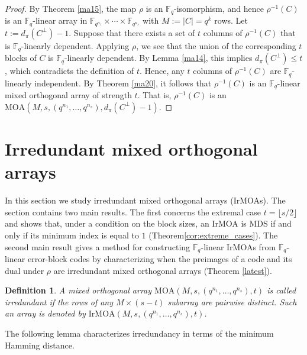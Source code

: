 \documentclass[11pt]{article}
\newtheorem{Definition}[Theorem]{Definition}
\newtheorem{Definition and Notation}[Theorem]{Definition and Notation}
\begin{document}
\begin{proof}
By Theorem \ref{ma15}, the map $\rho$ is an $\mathbb{F}_q$-isomorphism, and hence $\rho^{-1}(C)$ is an $\mathbb{F}_q$-linear array in $\mathbb{F}_{q^{n_1}}\times\cdots\times\mathbb{F}_{q^{n_s}}$ with $M:=|C|=q^k$ rows. Let $t := d_\pi(C^\perp)-1.$ Suppose that there exists a set of $t$ columns of $\rho^{-1}(C)$ that is $\mathbb F_q$-linearly dependent. Applying $\rho$, we see that the union of the corresponding $t$ blocks of $C$ is $\mathbb{F}_q$-linearly dependent. By Lemma \ref{ma14}, this implies $d_\pi(C^\perp)\le t$, which contradicts the definition of $t$. Hence, any $t$ columns of $\rho^{-1}(C)$ are $\mathbb{F}_q$-linearly independent. By Theorem \ref{ma20}, it follows that $\rho^{-1}(C)$ is an $\mathbb{F}_q$-linear mixed orthogonal array of strength $t$. That is, $\rho^{-1}(C)$ is an $\mathrm{MOA}\left(M, s, (q^{n_1},\dots,q^{n_s}), d_\pi(C^\perp)-1\right)$.
\end{proof}


\section{Irredundant mixed orthogonal arrays}

In this section we study irredundant mixed orthogonal arrays (IrMOAs).  The section contains two main results. The first concerns the extremal case $t=\lfloor s/2\rfloor$ and shows that, under a  condition on the block sizes, an IrMOA is MDS if and only if its minimum index is equal to $1$ (Theorem\ref{cor:extreme_cases}). The second main result gives a method for constructing $\mathbb{F}_q$-linear IrMOAs from $\mathbb{F}_q$-linear error-block codes by characterizing when the preimages of a code and its dual under $\rho$ are irredundant mixed orthogonal arrays (Theorem \ref{latest}).

\begin{Definition}\cite{GBZ2016}
A mixed orthogonal array $\mathrm{MOA}\left(M, s, (q^{n_1},\dots, q^{n_s}), t\right)$ is called irredundant if the rows of any $M\times (s-t)$ subarray are pairwise distinct. Such an array is denoted by $\mathrm{IrMOA}(M, s, (q^{n_1},\dots, q^{n_s}), t)$.
\end{Definition}

The following lemma characterizes irredundancy in terms of the minimum Hamming distance.
\end{document}
